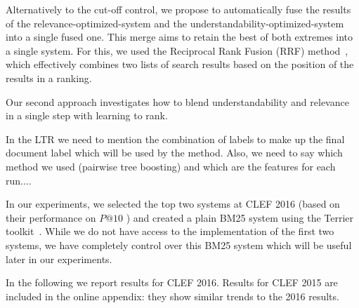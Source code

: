Alternatively to the cut-off control, we propose to automatically fuse the results of the relevance-optimized-system and the understandability-optimized-system into a single fused one.
This merge aims to retain the best of both extremes into a single system. For this, we used the Reciprocal Rank Fusion (RRF) method~\cite{cormack09}, which effectively combines two lists of search results based on the position of the results in a ranking.

Our second approach investigates how to blend understandability and relevance in a single step with learning to rank.


In the LTR we need to mention the combination of labels to make up the final document label which will be used by the method. Also, we need to say which method we used (pairwise tree boosting) and which are the features for each run....


In our experiments, we selected the top two systems at CLEF 2016 (based on their performance on $P@10$ ) 
and created a plain BM25 system using the Terrier toolkit~\cite{terrier}. While we do not have access to the implementation of the first two systems, we have completely control over this BM25 system which will be useful later in our experiments.




In the following we report results for CLEF 2016. Results for CLEF 2015 are included in the online appendix: they show similar trends to the 2016 results.

